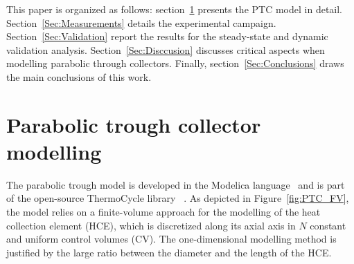\documentclass[final,3p,times,review]{elsarticle}
\begin{document}
This paper is organized as follows: section~\ref{Sec:DynModel} presents the PTC model in detail. Section~\ref{Sec:Measurements} details the experimental campaign. Section~\ref{Sec:Validation} report the results for the steady-state and dynamic validation analysis. Section~\ref{Sec:Disccusion} discusses critical aspects when modelling parabolic through collectors. Finally, section~\ref{Sec:Conclusions} draws the main conclusions of this work.
%
\section{Parabolic trough collector modelling}
\label{Sec:DynModel}

The parabolic trough model is developed in the Modelica language~\cite{Elmqvist1978} and is part of the open-source ThermoCycle library ~\cite{Quoilin2014a}. As depicted in Figure~\ref{fig:PTC_FV}, the model relies on a finite-volume approach for the modelling of the heat collection element (HCE), which is discretized along its axial axis in $N$ constant and uniform control volumes (CV). The one-dimensional modelling method is justified by the large ratio between the diameter and the length of the HCE. 
%
\end{document}
